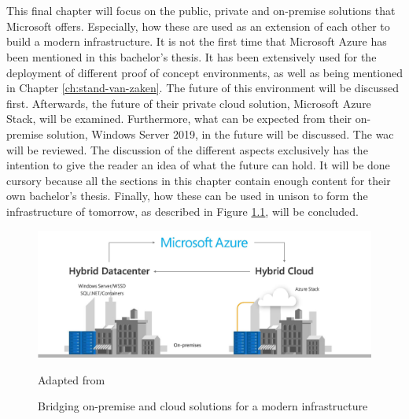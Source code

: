 \chapter{}
\label{ch:toekomstvisie}
This final chapter will focus on the public, private and on-premise solutions that Microsoft offers. 
Especially, how these are used as an extension of each other to build a modern infrastructure. 
It is not the first time that Microsoft Azure has been mentioned in this bachelor's thesis. 
It has been extensively used for the deployment of different proof of concept environments, as well as being mentioned in Chapter \ref{ch:stand-van-zaken}. 
The future of this environment will be discussed first. 
Afterwards, the future of their private cloud solution, Microsoft Azure Stack, will be examined. 
Furthermore, what can be expected from their on-premise solution, Windows Server 2019, in the future will be discussed. 
The \acrlong{wac} will be reviewed. 
The discussion of the different aspects exclusively has the intention to give the reader an idea of what the future can hold. 
It will be done cursory because all the sections in this chapter contain enough content for their own bachelor's thesis. 
Finally, how these can be used in unison to form the infrastructure of tomorrow, as described in Figure \ref{fig:Azure_FullCircle}, will be concluded.

\begin{figure}[h]
	\captionsetup{width=0.6\linewidth}
	\includegraphics[width=0.7\linewidth]{img/Toekomstvisie/Azure1.png}
	\centering
	\caption[Modern infrastructure]{Bridging on-premise and cloud solutions for a modern infrastructure}
	\scriptsize	
	Adapted from \cite{Singh2019}
	\label{fig:Azure_FullCircle}
\end{figure}

\clearpage

